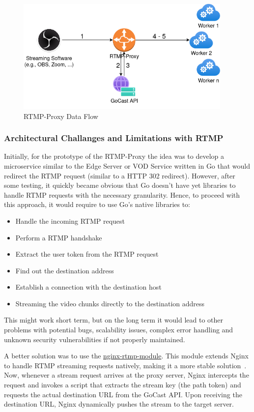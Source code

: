 \begin{figure}[htpb]
    \centering
    \includegraphics[width=300pt]{images/RtmpProxy.png}
    \caption[RTMP-Proxy Flow]{RTMP-Proxy Data Flow}\label{fig:rtmp-proxy}
\end{figure}

\subsubsection{Architectural Challanges and Limitations with RTMP}

Initially, for the prototype of the RTMP-Proxy the idea was to develop a microservice similar to the Edge Server or VOD Service written in Go that would redirect the RTMP request (similar to a HTTP 302 redirect). However, after some testing, it quickly became obvious that Go doesn't have yet libraries to handle RTMP requests with the necessary granularity. Hence, to proceed with this approach, it would require to use Go's native libraries to: 
\begin{itemize}
\item Handle the incoming \ac{RTMP} request
\item Perform a RTMP handshake
\item Extract the user token from the RTMP request
\item Find out the destination address
\item Establish a connection with the destination host
\item Streaming the video chunks directly to the destination address
\end{itemize}

This might work short term, but on the long term it would lead to other problems with potential bugs, scalability issues, complex error handling and unknown security vulnerabilities if not properly maintained.

A better solution was to use the \href{https://github.com/arut/nginx-rtmp-module}{nginx-rtmp-module}. This module extends Nginx to handle \ac{RTMP} streaming requests natively, making it a more stable solution~\parencite{nginx_rtmp_module}. 
Now, whenever a stream request arrives at the proxy server, Nginx intercepts the request and invokes a script that extracts the stream key (the path token) and requests the actual destination URL from the GoCast \ac{API}. Upon receiving the destination URL, Nginx dynamically pushes the stream to the target server.

